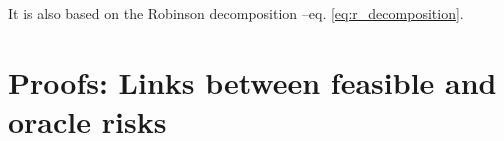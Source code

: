 \documentclass[10pt,twocolumn]{article}
\newtheorem{definition}{Definition}
\newtheorem{lemma}{Lemma}
\begin{document}
It is also based on the Robinson decomposition --eq. \ref{eq:r_decomposition}. %

\section{Proofs: Links between feasible and oracle risks}\label{apd:proofs}






\end{document}
